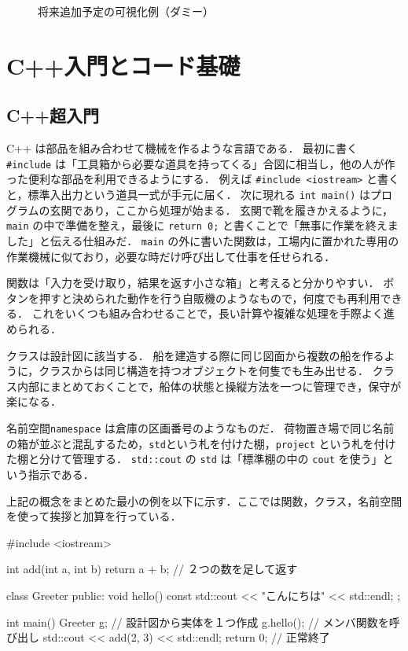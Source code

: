 \documentclass[10pt,letterpaper]{jsarticle}
\begin{document}
\begin{figure}[htbp]
  \centering
  \fbox{\rule{0pt}{4cm}\rule{6cm}{0pt}}
  \caption{将来追加予定の可視化例（ダミー）}
\end{figure}

\appendix
\section{C++入門とコード基礎}\label{app:cpp-basics}

\subsection{C++超入門}
C++ は部品を組み合わせて機械を作るような言語である．
最初に書く \verb|#include| は「工具箱から必要な道具を持ってくる」合図に相当し，他の人が作った便利な部品を利用できるようにする．
例えば \verb|#include <iostream>| と書くと，標準入出力という道具一式が手元に届く．
次に現れる \verb|int main()| はプログラムの玄関であり，ここから処理が始まる．
玄関で靴を履きかえるように，\verb|main| の中で準備を整え，最後に \verb|return 0;| と書くことで「無事に作業を終えました」と伝える仕組みだ．
\verb|main| の外に書いた関数は，工場内に置かれた専用の作業機械に似ており，必要な時だけ呼び出して仕事を任せられる．

関数は「入力を受け取り，結果を返す小さな箱」と考えると分かりやすい．
ボタンを押すと決められた動作を行う自販機のようなもので，何度でも再利用できる．
これをいくつも組み合わせることで，長い計算や複雑な処理を手際よく進められる．

クラスは設計図に該当する．
船を建造する際に同じ図面から複数の船を作るように，クラスからは同じ構造を持つオブジェクトを何隻でも生み出せる．
クラス内部にまとめておくことで，船体の状態と操縦方法を一つに管理でき，保守が楽になる．

名前空間\verb|namespace| は倉庫の区画番号のようなものだ．
荷物置き場で同じ名前の箱が並ぶと混乱するため，\verb|std|という札を付けた棚，\verb|project| という札を付けた棚と分けて管理する．
\verb|std::cout| の \verb|std| は「標準棚の中の \verb|cout| を使う」という指示である．

上記の概念をまとめた最小の例を以下に示す．ここでは関数，クラス，名前空間を使って挨拶と加算を行っている．

\begin{cppcode}[label=lst:hello,caption=最小のC++プログラム]
#include <iostream>

int add(int a, int b) {
    return a + b; // ２つの数を足して返す
}

class Greeter {
public:
    void hello() const {
        std::cout << "こんにちは" << std::endl;
    }
};

int main() {
    Greeter g;      // 設計図から実体を１つ作成
    g.hello();      // メンバ関数を呼び出し
    std::cout << add(2, 3) << std::endl;
    return 0;       // 正常終了
}
\end{cppcode}
\end{document}
